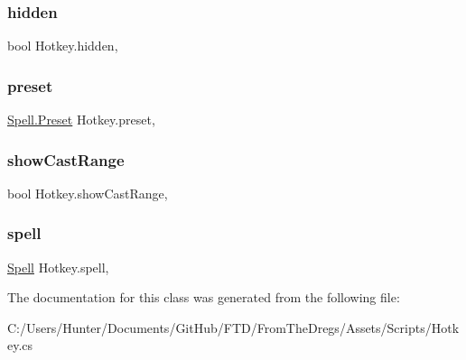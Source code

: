 \subsubsection{\texorpdfstring{hidden}{hidden}}
{\footnotesize\ttfamily bool Hotkey.\+hidden\hspace{0.3cm}{\ttfamily [get]}, {\ttfamily [set]}}

\mbox{\label{class_hotkey_a98f88450edff67278329260ff2e5ce2b}} 
\subsubsection{\texorpdfstring{preset}{preset}}
{\footnotesize\ttfamily \mbox{\hyperlink{class_spell_a5520e850e7000a6156b3456672b72ed1}{Spell.\+Preset}} Hotkey.\+preset\hspace{0.3cm}{\ttfamily [get]}, {\ttfamily [set]}}

\mbox{\label{class_hotkey_a960d18fbb18716a6cb3db53b46981cd1}} 
\subsubsection{\texorpdfstring{showCastRange}{showCastRange}}
{\footnotesize\ttfamily bool Hotkey.\+show\+Cast\+Range\hspace{0.3cm}{\ttfamily [get]}, {\ttfamily [set]}}

\mbox{\label{class_hotkey_acdccc2b352e81fbc8075f5ddb77cd6df}} 
\subsubsection{\texorpdfstring{spell}{spell}}
{\footnotesize\ttfamily \mbox{\hyperlink{class_spell}{Spell}} Hotkey.\+spell\hspace{0.3cm}{\ttfamily [get]}, {\ttfamily [set]}}



The documentation for this class was generated from the following file\+:\begin{DoxyCompactItemize}
\item 
C\+:/\+Users/\+Hunter/\+Documents/\+Git\+Hub/\+F\+T\+D/\+From\+The\+Dregs/\+Assets/\+Scripts/Hotkey.\+cs\end{DoxyCompactItemize}
